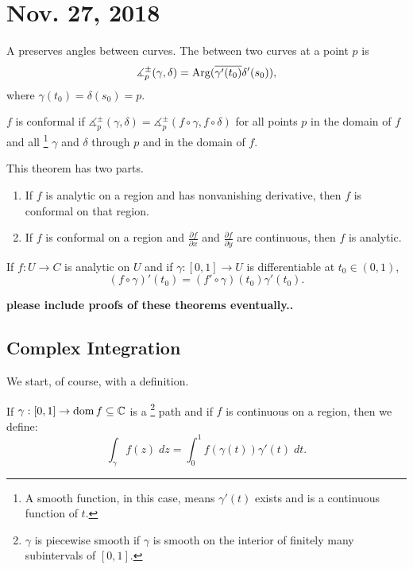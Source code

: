 \documentclass[notes]{subfile}
\begin{document}
\section{Nov. 27, 2018}

A  preserves angles between curves.
The  between two curves at a point $p$ is 
\[ \measuredangle_p^{\pm}(\gamma, \delta) = 
{\operatorname{Arg}} (\overline{\gamma'(t_0)} \delta'(s_0)),\]
where $\gamma(t_0) = \delta(s_0) = p$.

\begin{definition}
    $f$ is conformal if $\measuredangle_p^{\pm}(\gamma, \delta) = \measuredangle_p^{\pm}(f \circ \gamma, f \circ \delta)$ 
    for all points $p$ in the domain of $f$ and all \footnote{A smooth function, in this case, means
    $\gamma'(t)$ exists and is a continuous function of $t$.} $\gamma$
    and $\delta$ through $p$ and in the domain of $f$.
\end{definition}
 
\begin{theorem}
    This theorem has two parts.
    \begin{enumerate}
        \item If $f$ is analytic on a region and has nonvanishing
            derivative, then $f$ is conformal on that region.

        \item If $f$ is conformal on a region and 
            $\frac{\partial f}{\partial x}$ and 
            $\frac{\partial f}{\partial y}$ are continuous,
            then $f$ is analytic.
    \end{enumerate}
\end{theorem}

\begin{lemma}
    If $f : U \to C$ is analytic on $U$ and if $\gamma : [0,1]
    \to U$ is differentiable at $t_0 \in (0,1)$,
    \[ (f \circ \gamma)' (t_0) = (f' \circ \gamma) (t_0)
    \gamma'(t_0). \]
\end{lemma}

\textbf{please include proofs of these theorems eventually..}



\subsection{Complex Integration}
We start, of course, with a definition.

\begin{definition}
    If $\gamma: [0,1] \to \operatorname{dom}{f} \subseteq \operatorname{\mathbb{C}}$ is a 
    \footnote{$\gamma$ is piecewise 
    smooth if $\gamma$ is smooth on the interior of finitely
    many subintervals of $[0,1]$.}
    path and if $f$ is continuous on a region,
    then we define:
    \[ \int_{\gamma} f(z) \; dz = \int_0^1 f(\gamma(t))\gamma'(t) \;dt. \]

\end{definition}
\end{document}
